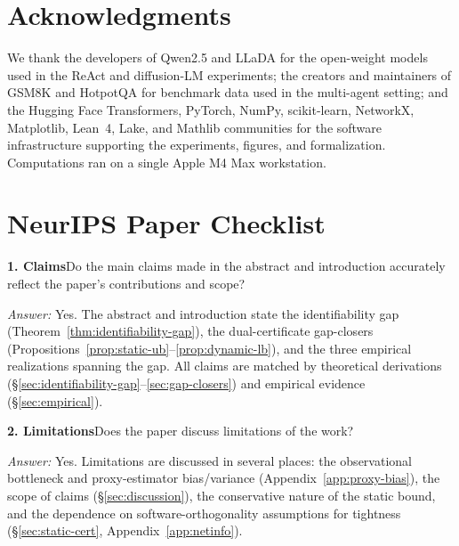\documentclass{article}
\begin{document}
\clearpage
\section*{Acknowledgments}

We thank the developers of Qwen2.5 and LLaDA for the open-weight models used in the ReAct and diffusion-LM experiments; the creators and maintainers of GSM8K and HotpotQA for benchmark data used in the multi-agent setting; and the Hugging Face Transformers, PyTorch, NumPy, scikit-learn, NetworkX, Matplotlib, Lean~4, Lake, and Mathlib communities for the software infrastructure supporting the experiments, figures, and formalization. Computations ran on a single Apple M4 Max workstation.




\section*{NeurIPS Paper Checklist}

\noindent\textbf{1. Claims}\quad Do the main claims made in the abstract and introduction accurately reflect the paper's contributions and scope?

\emph{Answer:} Yes. The abstract and introduction state the identifiability gap (Theorem~\ref{thm:identifiability-gap}), the dual-certificate gap-closers (Propositions~\ref{prop:static-ub}--\ref{prop:dynamic-lb}), and the three empirical realizations spanning the gap. All claims are matched by theoretical derivations (\S\ref{sec:identifiability-gap}--\ref{sec:gap-closers}) and empirical evidence (\S\ref{sec:empirical}).

\noindent\textbf{2. Limitations}\quad Does the paper discuss limitations of the work?

\emph{Answer:} Yes. Limitations are discussed in several places: the observational bottleneck and proxy-estimator bias/variance (Appendix~\ref{app:proxy-bias}), the scope of claims (\S\ref{sec:discussion}), the conservative nature of the static bound, and the dependence on software-orthogonality assumptions for tightness (\S\ref{sec:static-cert}, Appendix~\ref{app:netinfo}).
\end{document}

